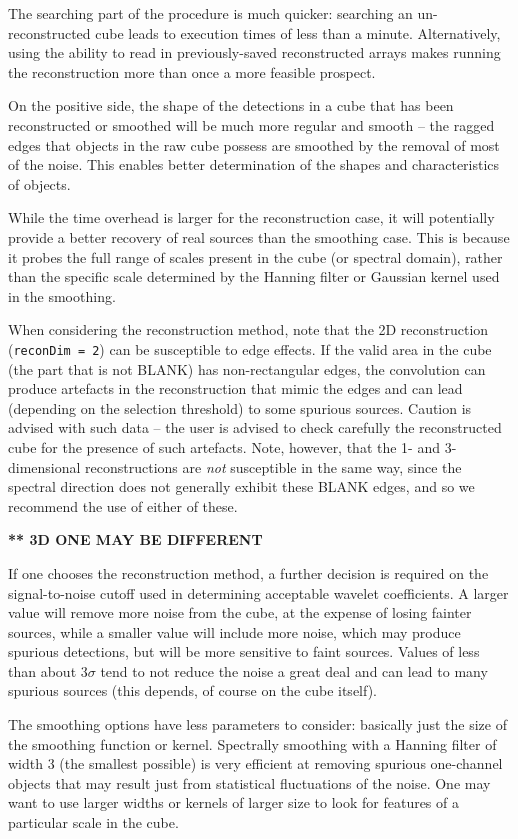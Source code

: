 The searching part of the procedure is much quicker: searching an
un-reconstructed cube leads to execution times of less than a
minute. Alternatively, using the ability to read in previously-saved
reconstructed arrays makes running the reconstruction more than once a
more feasible prospect.

On the positive side, the shape of the detections in a cube that has
been reconstructed or smoothed will be much more regular and smooth --
the ragged edges that objects in the raw cube possess are smoothed by
the removal of most of the noise. This enables better determination of
the shapes and characteristics of objects.

While the time overhead is larger for the reconstruction case, it will
potentially provide a better recovery of real sources than the
smoothing case. This is because it probes the full range of scales
present in the cube (or spectral domain), rather than the specific
scale determined by the Hanning filter or Gaussian kernel used in the
smoothing. 

When considering the reconstruction method, note that the 2D
reconstruction (\texttt{reconDim = 2}) can be susceptible to edge
effects. If the valid area in the cube (\ie the part that is not
BLANK) has non-rectangular edges, the convolution can produce
artefacts in the reconstruction that mimic the edges and can lead
(depending on the selection threshold) to some spurious
sources. Caution is advised with such data -- the user is advised to
check carefully the reconstructed cube for the presence of such
artefacts. Note, however, that the 1- and 3-dimensional
reconstructions are \emph{not} susceptible in the same way, since the
spectral direction does not generally exhibit these BLANK edges, and
so we recommend the use of either of these.

{\bf *** 3D  ONE MAY BE DIFFERENT}

If one chooses the reconstruction method, a further decision is
required on the signal-to-noise cutoff used in determining acceptable
wavelet coefficients. A larger value will remove more noise from the
cube, at the expense of losing fainter sources, while a smaller value
will include more noise, which may produce spurious detections, but
will be more sensitive to faint sources. Values of less than about
$3\sigma$ tend to not reduce the noise a great deal and can lead to
many spurious sources (this depends, of course on the cube itself).

The smoothing options have less parameters to consider: basically just
the size of the smoothing function or kernel. Spectrally smoothing
with a Hanning filter of width 3 (the smallest possible) is very
efficient at removing spurious one-channel objects that may result
just from statistical fluctuations of the noise. One may want to use
larger widths or kernels of larger size to look for features of a
particular scale in the cube.

